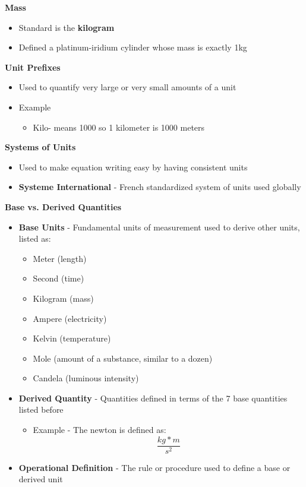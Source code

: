 \textbf{Mass}
    \begin{itemize}
        \item Standard is the \textbf{kilogram}
        \item Defined a platinum-iridium cylinder whose mass is exactly 1kg
    \end{itemize}
    
\textbf{Unit Prefixes}
    \begin{itemize}
        \item Used to quantify very large or very small amounts of a unit
        \item Example
        \begin{itemize}
            \item Kilo- means 1000 so 1 kilometer is 1000 meters
        \end{itemize}
    \end{itemize}

\textbf{Systems of Units}
    \begin{itemize}
        \item Used to make equation writing easy by having consistent units
        \item \textbf{Systeme International} - French standardized system of units used globally 
    \end{itemize}

\textbf{Base vs. Derived Quantities}
    \begin{itemize}
        \item \textbf{Base Units} - Fundamental units of measurement used to derive other units, listed as:
        \begin{itemize}
            \item Meter (length)
            \item Second (time)
            \item Kilogram (mass)
            \item Ampere (electricity)
            \item Kelvin (temperature)
            \item Mole (amount of a substance, similar to a dozen)
            \item Candela (luminous intensity)
        \end{itemize}
        \item \textbf{Derived Quantity} - Quantities defined in terms of the 7 base quantities listed before
        \begin{itemize}
            \item Example - The newton is defined as: \[\frac{kg*m}{s^2}\]
        \end{itemize}
        \item \textbf{Operational Definition} - The rule or procedure used to define a base or derived unit
    \end{itemize}


